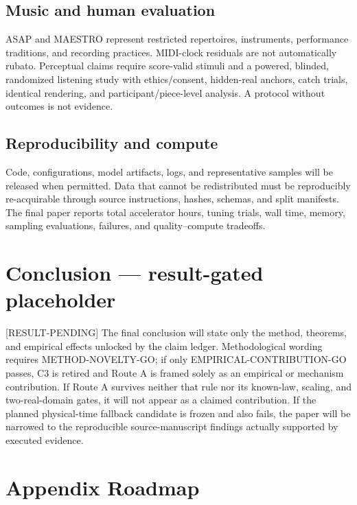 \documentclass[11pt]{article}
\newcommand{\status}[1]{%
  \textcolor{statusred}{\textbf{\texttt{[#1]}}}%
}
\newcommand{\code}[1]{\nolinkurl{#1}}
\def\status#1{[#1]}%
\def\code#1{#1}%
\begin{document}
\subsection{Music and human evaluation}
\label{sec:music-and-human-evaluation}

ASAP and MAESTRO represent restricted repertoires, instruments, performance traditions, and recording practices. MIDI-clock residuals are not automatically rubato. Perceptual claims require score-valid stimuli and a powered, blinded, randomized listening study with ethics/\allowbreak{}consent, hidden-real anchors, catch trials, identical rendering, and participant/\allowbreak{}piece-level analysis. A protocol without outcomes is not evidence.

\subsection{Reproducibility and compute}
\label{sec:reproducibility-and-compute}

Code, configurations, model artifacts, logs, and representative samples will be released when permitted. Data that cannot be redistributed must be reproducibly re-acquirable through source instructions, hashes, schemas, and split manifests. The final paper reports total accelerator hours, tuning trials, wall time, memory, sampling evaluations, failures, and quality--compute tradeoffs.

\section{Conclusion --- result-gated placeholder}
\label{sec:conclusion-result-gated-placeholder}

\status{RESULT-PENDING} The final conclusion will state only the method, theorems, and empirical effects unlocked by the claim ledger. Methodological wording requires \code{METHOD-NOVELTY-GO}; if only \code{EMPIRICAL-CONTRIBUTION-GO} passes, C3 is retired and Route A is framed solely as an empirical or mechanism contribution. If Route A survives neither that rule nor its known-law, scaling, and two-real-domain gates, it will not appear as a claimed contribution. If the planned physical-time fallback candidate is frozen and also fails, the paper will be narrowed to the reproducible source-manuscript findings actually supported by executed evidence.

\section*{Appendix Roadmap}
\end{document}
